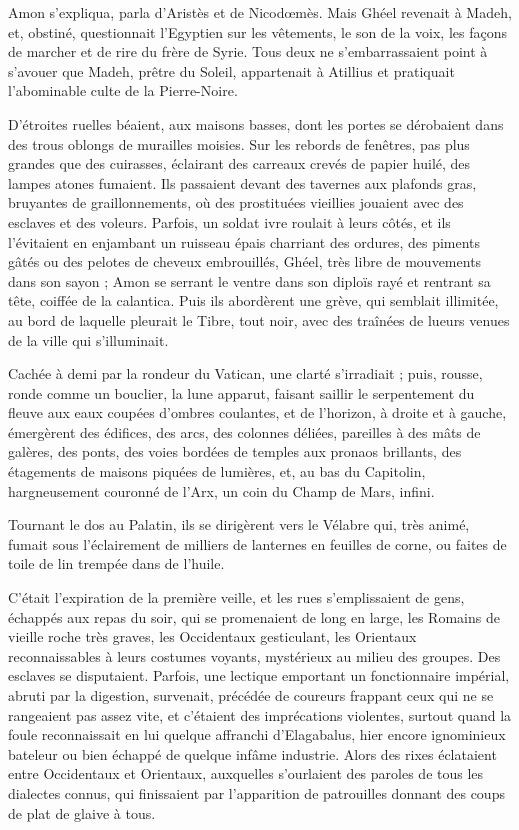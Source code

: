 \documentclass[a4paper, 11pt, oneside, polutonikogreek, french]{article}
\begin{document}
Amon s'expliqua, parla d'Aristès et de Nicodœmès. Mais Ghéel revenait à Madeh, et, obstiné, questionnait l'Egyptien sur les vêtements, le son de la voix, les façons de marcher et de rire du frère de Syrie. Tous deux ne s'embarrassaient point à s'avouer que Madeh, prêtre du Soleil, appartenait à Atillius et pratiquait l'abominable culte de la Pierre-Noire.

D'étroites ruelles béaient, aux maisons basses, dont les portes se dérobaient dans des trous oblongs de murailles moisies. Sur les rebords de fenêtres, pas plus grandes que des cuirasses, éclairant des carreaux crevés de papier huilé, des lampes atones fumaient. Ils passaient devant des tavernes aux plafonds gras, bruyantes de graillonnements, où des prostituées vieillies jouaient avec des esclaves et des voleurs. Parfois, un soldat ivre roulait à leurs côtés, et ils l'évitaient en enjambant un ruisseau épais charriant des ordures, des piments gâtés ou des pelotes de cheveux embrouillés, Ghéel, très libre de mouvements dans son sayon ; Amon se serrant le ventre dans son diploïs rayé et rentrant sa tête, coiffée de la calantica. Puis ils abordèrent une grève, qui semblait illimitée, au bord de laquelle pleurait le Tibre, tout noir, avec des traînées de lueurs venues de la ville qui s'illuminait.

Cachée à demi par la rondeur du Vatican, une clarté s'irradiait ; puis, rousse, ronde comme un bouclier, la lune apparut, faisant saillir le serpentement du fleuve aux eaux coupées d'ombres coulantes, et de l'horizon, à droite et à gauche, émergèrent des édifices, des arcs, des colonnes déliées, pareilles à des mâts de galères, des ponts, des voies bordées de temples aux pronaos brillants, des étagements de maisons piquées de lumières, et, au bas du Capitolin, hargneusement couronné de l'Arx, un coin du Champ de Mars, infini.

Tournant le dos au Palatin, ils se dirigèrent vers le Vélabre qui, très animé, fumait sous l'éclairement de milliers de lanternes en feuilles de corne, ou faites de toile de lin trempée dans de l'huile.

C'était l'expiration de la première veille, et les rues s'emplissaient de gens, échappés aux repas du soir, qui se promenaient de long en large, les Romains de vieille roche très graves, les Occidentaux gesticulant, les Orientaux reconnaissables à leurs costumes voyants, mystérieux au milieu des groupes. Des esclaves se disputaient. Parfois, une lectique emportant un fonctionnaire impérial, abruti par la digestion, survenait, précédée de coureurs frappant ceux qui ne se rangeaient pas assez vite, et c'étaient des imprécations violentes, surtout quand la foule reconnaissait en lui quelque affranchi d'Elagabalus, hier encore ignominieux bateleur ou bien échappé de quelque infâme industrie. Alors des rixes éclataient entre Occidentaux et Orientaux, auxquelles s'ourlaient des paroles de tous les dialectes connus, qui finissaient par l'apparition de patrouilles donnant des coups de plat de glaive à tous.
\end{document}
